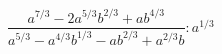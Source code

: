 \begin{ex}[type=expression]
	\begin{condition}
		\( \dfrac{a^{7/3}-2a^{5/3}b^{2/3}+ab^{4/3}}{a^{5/3}-a^{4/3}b^{1/3}-ab^{2/3}+a^{2/3}b}:a^{1/3} \)
	\end{condition}
\end{ex}